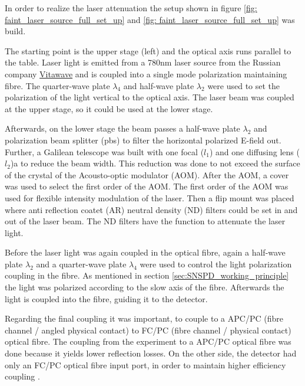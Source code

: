 
In order to realize the laser attenuation the setup shown in figure \ref{fig: faint_laser_source_full_set_up} and
\ref{fig: faint_laser_source_full_set_up} was build.

The starting point is the upper stage (left) and the optical axis runs parallel to the table.
Laser light is emitted from a 780nm laser source from the Russian company \href{http://vitawave.ru/eng/}{Vitawave} and
is coupled into a single mode polarization maintaining fibre.
The quarter-wave plate $\lambda_4$ and half-wave plate $\lambda_2$ were used to set the polarization of the light vertical
to the optical axis.
The laser beam was coupled at the upper stage, so it could be used at the lower stage.

Afterwards, on the lower stage the beam passes a half-wave plate $\lambda_2$ and polarization beam splitter (pbs) to filter the horizontal
polarized E-field out.
Further, a Galilean telescope was built with one focal ($l_1$) and one diffusing lens ($l_2$)a to reduce the beam width.
This reduction was done to not exceed the surface of the crystal of the Acousto-optic modulator (AOM).
After the AOM, a cover was used to select the first order of the AOM.
The first order of the AOM was used for flexible intensity modulation of the laser.
Then a flip mount was placed where anti reflection coatet (AR) neutral density (ND) filters could be set in and out of the laser beam.
The ND filters have the function to attenuate the laser light.

Before the laser light was again coupled in the optical fibre, again a half-wave plate $\lambda_2$ and a quarter-wave
plate $\lambda_4$ were used to control the light polarization coupling in the fibre.
As mentioned in section \ref{sec:SNSPD_working_principle} the light was polarized according to the slow axis of the fibre.
Afterwards the light is coupled into the fibre, guiding it to the detector.

Regarding the final coupling it was important, to couple to a APC/PC (fibre channel / angled physical contact) to FC/PC (fibre channel / physical contact) optical fibre.
The coupling from the experiment to a APC/PC optical fibre was done because it yields lower reflection losses.
On the other side, the detector had only an FC/PC optical fibre input port, in order to maintain higher efficiency coupling \cite{single-quantum-2022}.\\

